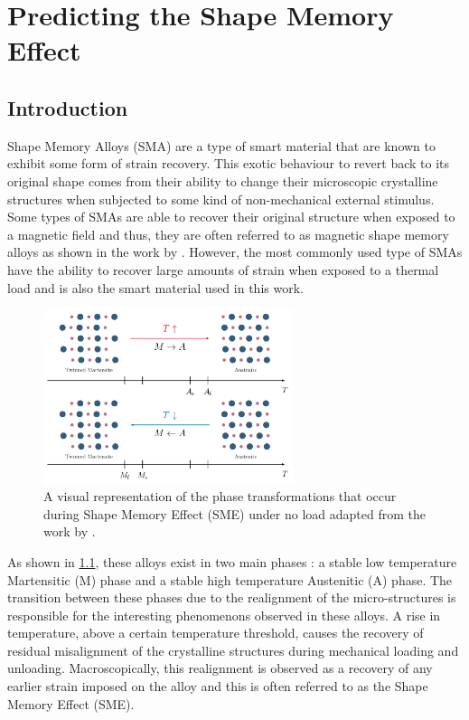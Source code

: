 
\chapter{Predicting the Shape Memory Effect}\label{chap:sma-model}
\section{Introduction}
Shape Memory Alloys (SMA) are a type of smart material that are known to exhibit some form of strain recovery. This exotic behaviour to revert back to its original shape comes from their ability to change their microscopic crystalline structures when subjected to some kind of non-mechanical external stimulus. Some types of SMAs are able to recover their original structure when exposed to a magnetic field and thus, they are often referred to as magnetic shape memory alloys as shown in the work by \cite{faranFerromagneticShapeMemory2016}. However, the most commonly used type of SMAs have the ability to recover large amounts of strain when exposed to a thermal load and is also the smart material used in this work.

\begin{figure}[hbt]
    \centering
    \includegraphics[width=0.65\textwidth]{images/chap2/sma-phase-transformations.pdf}
    \caption[A visual representation of the phase transformations that occur during Shape Memory Effect (SME) under no load]{A visual representation of the phase transformations that occur during Shape Memory Effect (SME) under no load adapted from the work by \cite{raoDesignShapeMemory2015}.}
    \label{fig:sma-phase-transformations}
\end{figure}

As shown in \cref{fig:sma-phase-transformations}, these alloys exist in two main phases : a stable low temperature Martensitic (M) phase and a stable high temperature Austenitic (A) phase. The transition between these phases due to the realignment of the micro-structures is responsible for the interesting phenomenons observed in these alloys. A rise in temperature, above a certain temperature threshold, causes the recovery of residual misalignment of the crystalline structures during mechanical loading and unloading. Macroscopically, this realignment is observed as a recovery of any earlier strain imposed on the alloy and this is often referred to as the Shape Memory Effect (SME).

